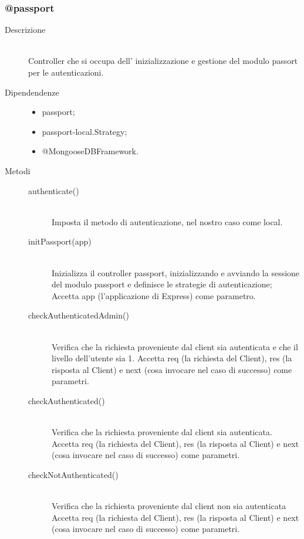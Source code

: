 \subsubsection{@passport}
\begin{description}
 \item[Descrizione] \hfill \\
Controller che si occupa dell' inizializzazione e gestione del modulo passort per le autenticazioni.
\item[Dipendendenze] \hfill
  \begin{itemize}
   \item passport;
   \item passport-local.Strategy;
   \item @MongooseDBFramework.
  \end{itemize}
   \item[Metodi] \hfill
    \begin{description}
     \item[authenticate()] \hfill \\
     Imposta il metodo di autenticazione, nel nostro caso come local.
     \item[initPassport(app)] \hfill \\
     Inizializza il controller passport, inizializzando e avviando la sessione del modulo passport e definisce le strategie di autenticazione; Accetta app (l'applicazione di Express) come parametro.
     \item[checkAuthenticatedAdmin()] \hfill \\
     Verifica che la richiesta proveniente dal client sia autenticata e che il livello dell'utente sia 1. Accetta req (la richiesta del Client), res (la risposta al Client) e next (cosa invocare nel caso di successo) come parametri.
     \item[checkAuthenticated()] \hfill \\
     Verifica che la richiesta proveniente dal client sia autenticata. Accetta req (la richiesta del Client), res (la risposta al Client) e next (cosa invocare nel caso di successo) come parametri.
     \item[checkNotAuthenticated()] \hfill \\
     Verifica che la richiesta proveniente dal client non sia autenticata Accetta req (la richiesta del Client), res (la risposta al Client) e next (cosa invocare nel caso di successo) come parametri.
     \end{description}
\end{description}


